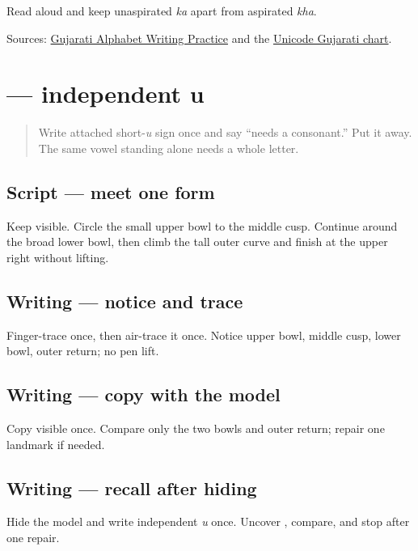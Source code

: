 \begin{tcolorbox}[breakable,colback=teal!4,colframe=teal!35!black,title={Before you move on}]
Read \textbf{ } aloud and keep unaspirated \emph{ka} apart from aspirated \emph{kha}.

Sources: \href{https://www.t30apps.com/gujarati-alphabet-writing/}{Gujarati Alphabet Writing Practice} and the \href{https://www.unicode.org/charts/PDF/U0A80.pdf}{Unicode Gujarati chart}.
\end{tcolorbox}
\section[\texorpdfstring{\gu{ઉ} (u)}{ઉ (u)}]{ — independent u}

\label{lesson:GU-W06-independent-u}



\begin{quote}
Write attached short-\emph{u} sign \textbf{} once and say “needs a consonant.” Put it away. The same vowel standing alone needs a whole letter.
\end{quote}

\subsection*{Script — meet one form}
Keep \textbf{} visible. Circle the small upper bowl to the middle cusp. Continue around the broad lower bowl, then climb the tall outer curve and finish at the upper right without lifting.

\subsection*{Writing — notice and trace}

Finger-trace \textbf{} once, then air-trace it once. Notice upper bowl, middle cusp, lower bowl, outer return; no pen lift.

\subsection*{Writing — copy with the model}
Copy visible \textbf{} once. Compare only the two bowls and outer return; repair one landmark if needed.

\subsection*{Writing — recall after hiding}
Hide the model and write independent \emph{u} once. Uncover \textbf{}, compare, and stop after one repair.

